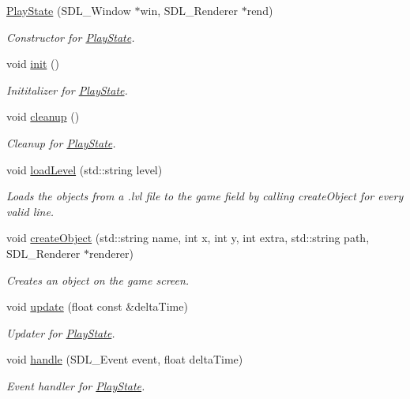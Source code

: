 \begin{DoxyCompactItemize}
\item 
\hyperlink{class_play_state_a264b0ceb6dd2b120a2f1a4734dc4c672}{Play\+State} (S\+D\+L\+\_\+\+Window $\ast$win, S\+D\+L\+\_\+\+Renderer $\ast$rend)
\begin{DoxyCompactList}\small\item\em Constructor for \hyperlink{class_play_state}{Play\+State}. \end{DoxyCompactList}\item 
void \hyperlink{class_play_state_a3925fcdaebf7413fc5455dd306997a72}{init} ()
\begin{DoxyCompactList}\small\item\em Inititalizer for \hyperlink{class_play_state}{Play\+State}. \end{DoxyCompactList}\item 
void \hyperlink{class_play_state_af49af6d2bc865f0912a0c4e91f00de1a}{cleanup} ()
\begin{DoxyCompactList}\small\item\em Cleanup for \hyperlink{class_play_state}{Play\+State}. \end{DoxyCompactList}\item 
void \hyperlink{class_play_state_a981800722e3b0aba8ed05b18a52565d4}{load\+Level} (std\+::string level)
\begin{DoxyCompactList}\small\item\em Loads the objects from a .lvl file to the game field by calling create\+Object for every valid line. \end{DoxyCompactList}\item 
void \hyperlink{class_play_state_a02dd7375d2bfa61488a9854989aa5620}{create\+Object} (std\+::string name, int x, int y, int extra, std\+::string path, S\+D\+L\+\_\+\+Renderer $\ast$renderer)
\begin{DoxyCompactList}\small\item\em Creates an object on the game screen. \end{DoxyCompactList}\item 
void \hyperlink{class_play_state_ad9f095205941cd7ebd7d191a50a801d1}{update} (float const \&delta\+Time)
\begin{DoxyCompactList}\small\item\em Updater for \hyperlink{class_play_state}{Play\+State}. \end{DoxyCompactList}\item 
void \hyperlink{class_play_state_a892af1f154c3d789bb7f44e7a53e570f}{handle} (S\+D\+L\+\_\+\+Event event, float delta\+Time)
\begin{DoxyCompactList}\small\item\em Event handler for \hyperlink{class_play_state}{Play\+State}. \end{DoxyCompactList}\end{DoxyCompactItemize}
